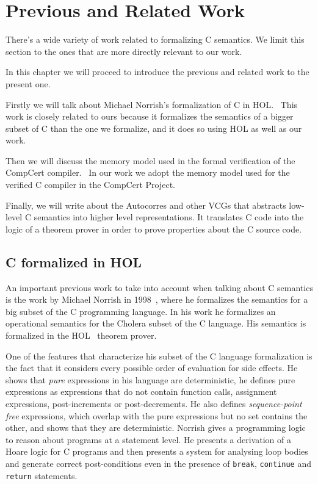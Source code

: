 \chapter{Previous and Related Work}\label{chapter:previous}

There's a wide variety of work related to formalizing C semantics.
We limit this section to the ones that are more directly relevant to our work.

In this chapter we will proceed to introduce the previous and related work to the present one.

Firstly we will talk about Michael Norrish's formalization of C in HOL.~\parencite{norrish}
This work is closely related to ours because it formalizes the semantics of a bigger subset of C than the one we formalize, and it does so using HOL as well as our work.

Then we will discuss the memory model used in the formal verification of the CompCert compiler.~\parencite{leroy-blazy-memory-model}
In our work we adopt the memory model used for the verified C compiler in the CompCert Project.

Finally, we will write about the Autocorres and other VCGs that abstracts low-level C semantics into higher level representations.
It translates C code into the logic of a theorem prover in order to prove properties about the C source code.

\section{C formalized in HOL}

An important previous work to take into account when talking about C semantics is the work by Michael Norrish in 1998~\parencite{norrish}, where he formalizes the semantics for a big subset of the C programming language.
In his work he formalizes an operational semantics for the Cholera subset of the C language.
His semantics is formalized in the HOL~\parencite{hol-doc} theorem prover.

One of the features that characterize his subset of the C language formalization is the fact that it considers every possible order of evaluation for side effects.
He shows that \textit{pure} expressions in his language are deterministic, he defines pure expressions as expressions that do not contain function calls, assignment expressions, post-increments or post-decrements.
He also defines \textit{sequence-point free} expressions, which overlap with the pure expressions but no set contains the other, and shows that they are deterministic.
Norrish gives a programming logic to reason about programs at a statement level.
He presents a derivation of a Hoare logic for C programs and then presents a system for analysing loop bodies and generate correct post-conditions even in the presence of \verb|break|, \verb|continue| and \verb|return| statements.

